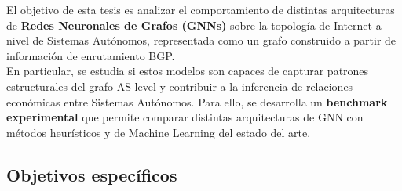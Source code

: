 El objetivo de esta tesis es analizar el comportamiento de distintas arquitecturas de 
\textbf{Redes Neuronales de Grafos (GNNs)} sobre la topología de Internet a nivel de Sistemas Autónomos, 
representada como un grafo construido a partir de información de 
enrutamiento BGP.\\

En particular, se estudia si estos modelos son capaces de capturar patrones estructurales del grafo AS-level 
y contribuir a la inferencia de relaciones económicas entre Sistemas Autónomos. Para ello, se desarrolla un 
\textbf{benchmark experimental} que permite comparar distintas arquitecturas de GNN con métodos heurísticos 
y de Machine Learning del estado del arte.









 






\subsection{Objetivos específicos}

